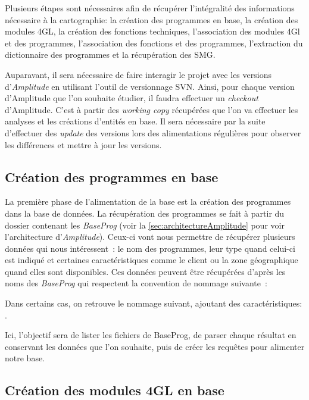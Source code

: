 \documentclass{polytech/polytech}
\begin{document}
Plusieurs étapes sont nécessaires afin de récupérer l'intégralité des informations nécessaire à la cartographie: la création des programmes en base, la création des modules 4GL, la création des fonctions techniques, l'association des modules 4Gl et des programmes, l'association des fonctions et des programmes, l'extraction du dictionnaire des programmes et la récupération des SMG.

Auparavant, il sera nécessaire de faire interagir le projet avec les versions d'\textit{Amplitude} en utilisant l'outil de versionnage SVN. Ainsi, pour chaque version d’Amplitude que l’on souhaite étudier, il faudra effectuer un \textit{checkout} d’Amplitude. C’est à partir des \textit{working copy} récupérées que l’on va effectuer les analyses et les créations d’entités en base. Il sera nécessaire par la suite d’effectuer des \textit{update} des versions lors des alimentations régulières pour observer les différences et mettre à jour les versions. 

\subsection{Création des programmes en base}

La première phase de l’alimentation de la base est la création des programmes dans la base de données. La récupération des programmes se fait à partir du dossier contenant les \textit{BaseProg} (voir la \autoref{sec:architectureAmplitude} pour voir l'architecture d'\textit{Amplitude}). Ceux-ci vont nous permettre de récupérer plusieurs données qui nous intéressent : le nom des programmes, leur type quand celui-ci est indiqué et certaines caractéristiques comme le client ou la zone géographique quand elles sont disponibles. Ces données peuvent être récupérées d’après les noms des \textit{BaseProg} qui respectent la convention de nommage suivante : 

Dans certains cas, on retrouve le nommage suivant, ajoutant des caractéristiques: . 

Ici, l’objectif sera de lister les fichiers de BaseProg, de parser chaque résultat en conservant les données que l’on souhaite, puis de créer les requêtes pour alimenter notre base. 

\subsection{Création des modules 4GL en base}
\end{document}
